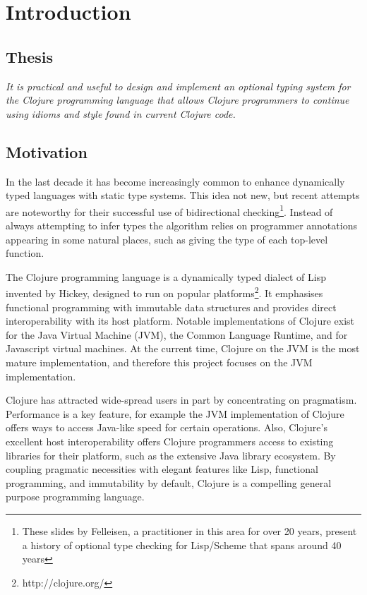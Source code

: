 \chapter{Introduction}

\section{Thesis}

\emph{It is practical and useful to design and implement an optional typing system 
for the Clojure programming language that allows Clojure programmers to continue 
using idioms and style found in current Clojure code.}

\section{Motivation}


In the last decade it has become increasingly common to enhance
dynamically typed languages with static type systems. 
This idea not new, but recent attempts are noteworthy for their successful use of bidirectional checking\footnote{These 
slides by Felleisen, a practitioner in this area for over 20 years, present a history of optional type checking
for Lisp/Scheme that spans around 40 years\cite{Fell09}}.
Instead of always attempting to infer types the algorithm relies on programmer annotations
appearing in some natural places, such as giving the type of each top-level function.

The Clojure programming language is a dynamically typed dialect of Lisp invented
by Hickey, designed to run on popular platforms\footnote{http://clojure.org/}.
It emphasises functional programming with immutable data structures
and provides direct interoperability with its host platform.
Notable implementations of Clojure exist for the Java Virtual Machine (JVM),
the Common Language Runtime, and for Javascript virtual machines.
At the current time, Clojure on the JVM is the most mature implementation,
and therefore this project focuses on the JVM implementation.

Clojure has attracted wide-spread users in part by concentrating on pragmatism.
Performance is a key feature, for example the JVM implementation of Clojure
offers ways to access Java-like speed for certain operations.
Also, Clojure's excellent host interoperability offers Clojure programmers
access to existing libraries for their platform, such as the extensive Java library ecosystem.
By coupling pragmatic necessities with elegant features like Lisp, functional programming,
and immutability by default, Clojure is a compelling general purpose programming language.

